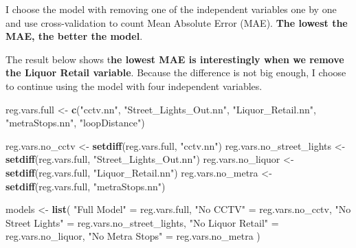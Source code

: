 \documentclass[
]{article}
\newenvironment{Shaded}{\begin{snugshade}}{\end{snugshade}}
\newcommand{\FunctionTok}[1]{\textcolor[rgb]{0.13,0.29,0.53}{\textbf{#1}}}
\newcommand{\NormalTok}[1]{#1}
\newcommand{\OtherTok}[1]{\textcolor[rgb]{0.56,0.35,0.01}{#1}}
\newcommand{\StringTok}[1]{\textcolor[rgb]{0.31,0.60,0.02}{#1}}
\begin{document}
I choose the model with removing one of the independent variables one by
one and use cross-validation to count Mean Absolute Error (MAE).
\textbf{The lowest the MAE, the better the model}.

The result below shows t\textbf{he lowest MAE is interestingly when we
remove the Liquor Retail variable}. Because the difference is not big
enough, I choose to continue using the model with four independent
variables.

\begin{Shaded}
\begin{Highlighting}[]
\NormalTok{reg.vars.full }\OtherTok{\textless{}{-}} \FunctionTok{c}\NormalTok{(}\StringTok{"cctv.nn"}\NormalTok{, }\StringTok{"Street\_Lights\_Out.nn"}\NormalTok{, }\StringTok{"Liquor\_Retail.nn"}\NormalTok{, }\StringTok{"metraStops.nn"}\NormalTok{, }\StringTok{"loopDistance"}\NormalTok{)}

\NormalTok{reg.vars.no\_cctv }\OtherTok{\textless{}{-}} \FunctionTok{setdiff}\NormalTok{(reg.vars.full, }\StringTok{"cctv.nn"}\NormalTok{)}
\NormalTok{reg.vars.no\_street\_lights }\OtherTok{\textless{}{-}} \FunctionTok{setdiff}\NormalTok{(reg.vars.full, }\StringTok{"Street\_Lights\_Out.nn"}\NormalTok{)}
\NormalTok{reg.vars.no\_liquor }\OtherTok{\textless{}{-}} \FunctionTok{setdiff}\NormalTok{(reg.vars.full, }\StringTok{"Liquor\_Retail.nn"}\NormalTok{)}
\NormalTok{reg.vars.no\_metra }\OtherTok{\textless{}{-}} \FunctionTok{setdiff}\NormalTok{(reg.vars.full, }\StringTok{"metraStops.nn"}\NormalTok{)}

\NormalTok{models }\OtherTok{\textless{}{-}} \FunctionTok{list}\NormalTok{(}
  \StringTok{"Full Model"} \OtherTok{=}\NormalTok{ reg.vars.full,}
  \StringTok{"No CCTV"} \OtherTok{=}\NormalTok{ reg.vars.no\_cctv,}
  \StringTok{"No Street Lights"} \OtherTok{=}\NormalTok{ reg.vars.no\_street\_lights,}
  \StringTok{"No Liquor Retail"} \OtherTok{=}\NormalTok{ reg.vars.no\_liquor,}
  \StringTok{"No Metra Stops"} \OtherTok{=}\NormalTok{ reg.vars.no\_metra}
\NormalTok{)}


\end{Highlighting}
\end{Shaded}
\end{document}
